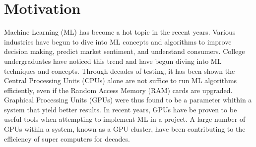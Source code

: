 \section*{Motivation}
\label{sec:Motivation}

Machine Learning (ML) has become a hot topic in the recent years. 
Various industries have begun to dive into ML concepts and algorithms  
to improve decision making, predict market sentiment, and understand consumers. 
College undergraduates have noticed this trend and have begun diving into ML techniques and concepts. 
Through decades of testing, it has been shown the Central Processing Units (CPUs) alone are not suffice to 
run ML algorithms efficiently, even if the Random Access Memory (RAM) cards are upgraded. 
Graphical Processing Units (GPUs) were thus found to be a parameter whithin a system that yield better results. 
In recent years, GPUs have be proven to be useful tools when attempting to implement ML in a project. 
A large number of GPUs within a system, known as a GPU cluster, have been contributing to the efficiency 
of super computers for decades. 
